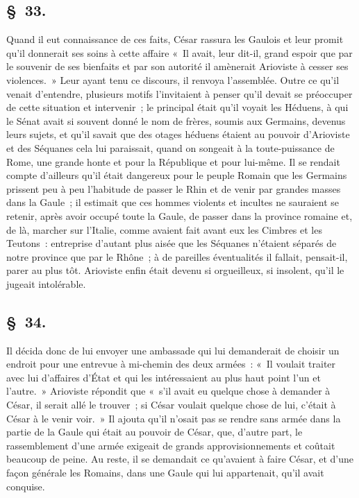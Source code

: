 \documentclass[french,twoside]{book} %
\begin{document}
\subsection[{§ 33.}]{ \textsc{§ 33.} }
\noindent Quand il eut connaissance de ces faits, César rassura les Gaulois et leur promit qu’il donnerait ses soins à cette affaire « Il avait, leur dit-il, grand espoir que par le souvenir de ses bienfaits et par son autorité il amènerait Arioviste à cesser ses violences. » Leur ayant tenu ce discours, il renvoya l’assemblée. Outre ce qu’il venait d’entendre, plusieurs motifs l’invitaient à penser qu’il devait se préoccuper de cette situation et intervenir ; le principal était qu’il voyait les Héduens, à qui le Sénat avait si souvent donné le nom de frères, soumis aux Germains, devenus leurs sujets, et qu’il savait que des otages héduens étaient au pouvoir d’Arioviste et des Séquanes cela lui paraissait, quand on songeait à la toute-puissance de Rome, une grande honte et pour la République et pour lui-même. Il se rendait compte d’ailleurs qu’il était dangereux pour le peuple Romain que les Germains prissent peu à peu l’habitude de passer le Rhin et de venir par grandes masses dans la Gaule ; il estimait que ces hommes violents et incultes ne sauraient se retenir, après avoir occupé toute la Gaule, de passer dans la province romaine et, de là, marcher sur l’Italie, comme avaient fait avant eux les Cimbres et les Teutons : entreprise d’autant plus aisée que les Séquanes n’étaient séparés de notre province que par le Rhône ; à de pareilles éventualités il fallait, pensait-il, parer au plus tôt. Arioviste enfin était devenu si orgueilleux, si insolent, qu’il le jugeait intolérable.
\subsection[{§ 34.}]{ \textsc{§ 34.} }
\noindent Il décida donc de lui envoyer une ambassade qui lui demanderait de choisir un endroit pour une entrevue à mi-chemin des deux armées : « Il voulait traiter avec lui d’affaires d’État et qui les intéressaient au plus haut point l’un et l’autre. » Arioviste répondit que « s’il avait eu quelque chose à demander à César, il serait allé le trouver ; si César voulait quelque chose de lui, c’était à César à le venir voir. » Il ajouta qu’il n’osait pas se rendre sans armée dans la partie de la Gaule qui était au pouvoir de César, que, d’autre part, le rassemblement d’une armée exigeait de grands approvisionnements et coûtait beaucoup de peine. Au reste, il se demandait ce qu’avaient à faire César, et d’une façon générale les Romains, dans une Gaule qui lui appartenait, qu’il avait conquise.
\end{document}
